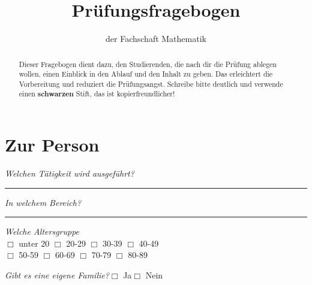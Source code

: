 \documentclass[a4paper,12pt]{scrartcl}
\newcommand{\checkbox}{\(\Box\)}
\newcommand{\hfilloutline}[1]{\rule{#1}{0.5pt}}
\newcommand{\frage}[1]{\textit{#1}}
\renewcommand{\emph}[1]{\textbf{#1}}
\begin{document}
\title{Prüfungsfragebogen}
\author{der Fachschaft Mathematik}
\date{}
\maketitle

\begin{abstract}
Dieser Fragebogen dient dazu, den Studierenden, die nach dir die Prüfung
ablegen wollen, einen Einblick in den Ablauf und den Inhalt zu geben. Das
erleichtert die Vorbereitung und reduziert die Prüfungsangst.  Schreibe bitte
deutlich und verwende einen \emph{schwarzen} Stift, das ist kopierfreundlicher!  
\end{abstract}

\section*{Zur Person}

\frage{Welchen Tätigkeit wird ausgeführt?}
\hfill\hfilloutline{9cm}


\frage{In welchem Bereich?}
\hfill\hfilloutline{9cm}


\frage{Welche Altersgruppe}\\
\checkbox{} unter 20 \hfill
\checkbox{} 20-29 \hfill
\checkbox{} 30-39 \hfill
\checkbox{} 40-49 \\
\checkbox{} 50-59 \hfill
\checkbox{} 60-69 \hfill
\checkbox{} 70-79 \hfill
\checkbox{} 80-89

\frage{Gibt es eine eigene Familie?}\hfill \checkbox{} Ja\hspace{0.8cm}\checkbox{} Nein
\newpage




\end{document}
